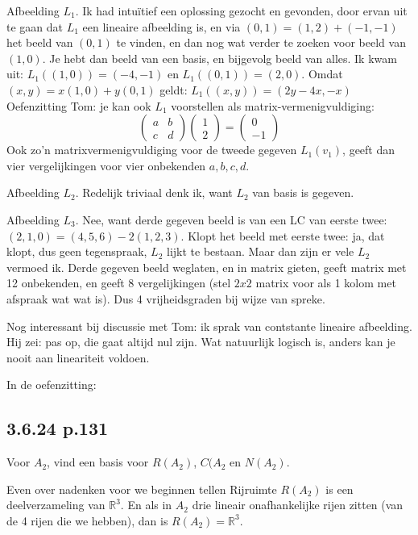 \documentclass{article}
\begin{document}
Afbeelding $L_1$. Ik had intu\"itief een oplossing gezocht en gevonden, door ervan uit te gaan dat $L_1$ een lineaire afbeelding is, en via $(0,1)=(1,2)+(-1,-1)$ het beeld van $(0,1)$ te vinden, en dan nog wat verder te zoeken voor beeld van $(1,0)$. Je hebt dan beeld van een basis, en bijgevolg beeld van alles. 
Ik kwam uit: 
$L_1((1,0))=(-4,-1)$ en 
$L_1((0,1))=(2,0)$. 
Omdat $(x,y)=x(1,0) + y(0,1)$ geldt: 
$L_1((x,y)) = ( 2y-4x, -x )$
Oefenzitting Tom: je kan ook $L_1$ voorstellen als matrix-vermenigvuldiging: 
\[
\begin{pmatrix}
a & b\\
c & d
\end{pmatrix}
\begin{pmatrix}
1\\
2
\end{pmatrix}
=
\begin{pmatrix}
0\\
-1
\end{pmatrix}
\]
Ook zo'n matrixvermenigvuldiging voor de tweede gegeven $L_1(v_1)$, geeft dan vier vergelijkingen voor vier onbekenden $a,b,c,d$. 

Afbeelding $L_2$. Redelijk triviaal denk ik, want $L_2$ van basis is gegeven. 

Afbeelding $L_3$. Nee, want derde gegeven beeld is van een LC van eerste twee: $(2,1,0) = (4,5,6)-2(1,2,3)$. Klopt het beeld met eerste twee: ja, dat klopt, dus geen tegenspraak, $L_2$ lijkt te bestaan. Maar dan zijn er vele $L_2$ vermoed ik. 
Derde gegeven beeld weglaten, en in matrix gieten, geeft matrix met 12 onbekenden, en geeft 8 vergelijkingen (stel $2x2$ matrix voor als 1 kolom met afspraak wat wat is). Dus 4 vrijheidsgraden bij wijze van spreke. 

Nog interessant bij discussie met Tom: ik sprak van contstante lineaire afbeelding. Hij zei: pas op, die gaat altijd nul zijn. Wat natuurlijk logisch is, anders kan je nooit aan lineariteit voldoen. 



In de oefenzitting: 
\subsection{3.6.24 p.131}
Voor $A_2$, vind een basis voor $R(A_2)$, $C(A_2$ en $N(A_2)$. 

Even over nadenken voor we beginnen tellen 
Rijruimte $R(A_2)$ is een deelverzameling van $\mathbb{R}^{3}$. En als in $A_2$ drie lineair onafhankelijke rijen zitten (van de 4 rijen die we hebben), dan is $R(A_2) = \mathbb{R}^{3}$. 
\end{document}
